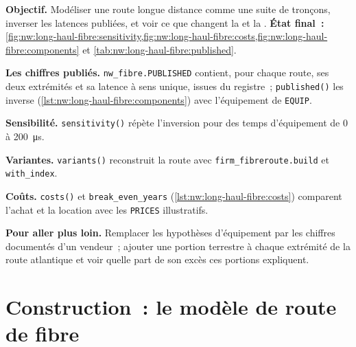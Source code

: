 \begin{tutorial}
\textbf{Objectif.} Modéliser une route longue distance comme une suite de tronçons, inverser les latences publiées, et voir ce que changent la  et la .
\textbf{État final~:} \cref{fig:nw:long-haul-fibre:sensitivity,fig:nw:long-haul-fibre:costs,fig:nw:long-haul-fibre:components} et
\cref{tab:nw:long-haul-fibre:published}.
\begin{tutsteps}
\item \textbf{Les chiffres publiés.} \texttt{nw\_fibre.PUBLISHED} contient, pour chaque route, ses deux extrémités et sa latence à sens unique, issues du registre~;
  \texttt{published()} les inverse (\cref{lst:nw:long-haul-fibre:components}) avec l'équipement de \texttt{EQUIP}.
\item \textbf{Sensibilité.} \texttt{sensitivity()} répète l'inversion pour des temps d'équipement de 0 à \qty{200}{\micro\second}.
\item \textbf{Variantes.} \texttt{variants()} reconstruit la route avec \texttt{firm\_fibreroute.build} et \texttt{with\_index}.
\item \textbf{Coûts.} \texttt{costs()} et \texttt{break\_even\_years} (\cref{lst:nw:long-haul-fibre:costs}) comparent l'achat et la location
  avec les \texttt{PRICES} illustratifs.
\end{tutsteps}
\textbf{Pour aller plus loin.} Remplacer les hypothèses d'équipement par les chiffres documentés d'un vendeur~; ajouter une portion terrestre à chaque extrémité de la
route atlantique et voir quelle part de son excès ces portions expliquent.
\end{tutorial}

\section{Construction~: le modèle de route de fibre}\label{bld:nw:long-haul-fibre:fibreroute}

